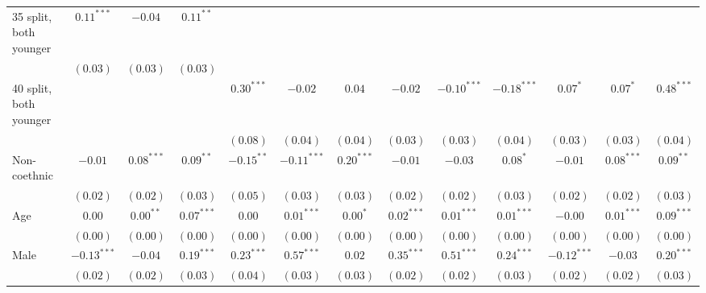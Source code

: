 \begin{table}
\begin{center}
\begin{threeparttable}
\begin{tabular}{l c c c c c c c c c c c c}
35 split, both younger          & $0.11^{***}$  & $-0.04$       & $0.11^{**}$   &              &               &               &               &               &               &               &               &               \\
                                & $(0.03)$      & $(0.03)$      & $(0.03)$      &              &               &               &               &               &               &               &               &               \\
40 split, both younger          &               &               &               & $0.30^{***}$ & $-0.02$       & $0.04$        & $-0.02$       & $-0.10^{***}$ & $-0.18^{***}$ & $0.07^{*}$    & $0.07^{*}$    & $0.48^{***}$  \\
                                &               &               &               & $(0.08)$     & $(0.04)$      & $(0.04)$      & $(0.03)$      & $(0.03)$      & $(0.04)$      & $(0.03)$      & $(0.03)$      & $(0.04)$      \\
Non-coethnic                    & $-0.01$       & $0.08^{***}$  & $0.09^{**}$   & $-0.15^{**}$ & $-0.11^{***}$ & $0.20^{***}$  & $-0.01$       & $-0.03$       & $0.08^{*}$    & $-0.01$       & $0.08^{***}$  & $0.09^{**}$   \\
                                & $(0.02)$      & $(0.02)$      & $(0.03)$      & $(0.05)$     & $(0.03)$      & $(0.03)$      & $(0.02)$      & $(0.02)$      & $(0.03)$      & $(0.02)$      & $(0.02)$      & $(0.03)$      \\
Age                             & $0.00$        & $0.00^{**}$   & $0.07^{***}$  & $0.00$       & $0.01^{***}$  & $0.00^{*}$    & $0.02^{***}$  & $0.01^{***}$  & $0.01^{***}$  & $-0.00$       & $0.01^{***}$  & $0.09^{***}$  \\
                                & $(0.00)$      & $(0.00)$      & $(0.00)$      & $(0.00)$     & $(0.00)$      & $(0.00)$      & $(0.00)$      & $(0.00)$      & $(0.00)$      & $(0.00)$      & $(0.00)$      & $(0.00)$      \\
Male                            & $-0.13^{***}$ & $-0.04$       & $0.19^{***}$  & $0.23^{***}$ & $0.57^{***}$  & $0.02$        & $0.35^{***}$  & $0.51^{***}$  & $0.24^{***}$  & $-0.12^{***}$ & $-0.03$       & $0.20^{***}$  \\
                                & $(0.02)$      & $(0.02)$      & $(0.03)$      & $(0.04)$     & $(0.03)$      & $(0.03)$      & $(0.02)$      & $(0.02)$      & $(0.03)$      & $(0.02)$      & $(0.02)$      & $(0.03)$      \\

\end{tabular}
\end{threeparttable}
\end{center}
\end{table}

